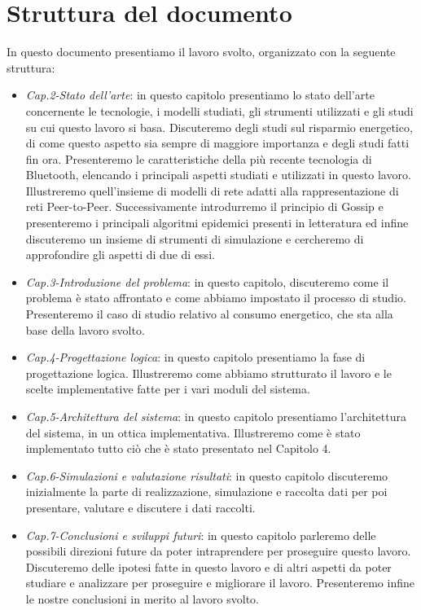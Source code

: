 \section{Struttura del documento}
In questo documento presentiamo il lavoro svolto, organizzato con la seguente struttura:
\begin{itemize}
	\item \textit{Cap.2-Stato dell'arte}: in questo capitolo presentiamo lo stato dell'arte concernente le tecnologie, i modelli studiati, gli strumenti utilizzati e gli studi su cui questo lavoro si basa. Discuteremo degli studi sul risparmio energetico, di come questo aspetto sia sempre di maggiore importanza e degli studi fatti fin ora. Presenteremo le caratteristiche della più recente tecnologia di Bluetooth, elencando i principali aspetti studiati e utilizzati in questo lavoro. Illustreremo quell'insieme di modelli di rete adatti alla rappresentazione di reti Peer-to-Peer. Successivamente introdurremo il principio di Gossip e presenteremo i principali algoritmi epidemici presenti in letteratura ed infine discuteremo un insieme di strumenti di simulazione e cercheremo di approfondire gli aspetti di due di essi.
	\item \textit{Cap.3-Introduzione del problema}: in questo capitolo, discuteremo come il problema è stato affrontato e come abbiamo impostato il processo di studio. Presenteremo il caso di studio relativo al consumo energetico, che sta alla base della lavoro svolto.
	\item \textit{Cap.4-Progettazione logica}: in questo capitolo presentiamo la fase di progettazione logica. Illustreremo come abbiamo strutturato il lavoro e le scelte implementative fatte per i vari moduli del sistema.
	\item \textit{Cap.5-Architettura del sistema}: in questo capitolo presentiamo l'architettura del sistema, in un ottica implementativa. Illustreremo come è stato implementato tutto ciò che è stato presentato nel Capitolo 4.
	\item \textit{Cap.6-Simulazioni e valutazione risultati}: in questo capitolo discuteremo inizialmente la parte di realizzazione, simulazione e raccolta dati per poi presentare, valutare e discutere i dati raccolti.
	\item \textit{Cap.7-Conclusioni e sviluppi futuri}: in questo capitolo parleremo delle possibili direzioni future da poter intraprendere per proseguire questo lavoro. Discuteremo delle ipotesi fatte in questo lavoro e di altri aspetti da poter studiare e analizzare per proseguire e migliorare il lavoro. Presenteremo infine le nostre conclusioni in merito al lavoro svolto.
\end{itemize}